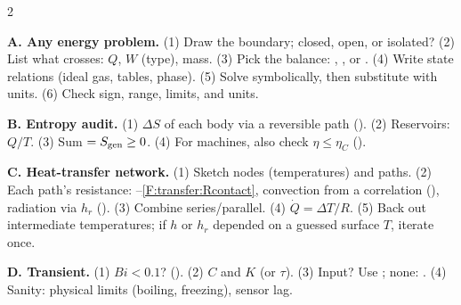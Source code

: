 \begin{multicols}{2}
\begin{keybox}\textbf{A. Any energy problem.} (1) Draw the boundary; closed, open, or isolated? (2) List what crosses: $Q$, $W$ (type), mass. (3) Pick the balance: , , or . (4) Write state relations (ideal gas, tables, phase). (5) Solve symbolically, then substitute with units. (6) Check sign, range, limits, and units.\end{keybox}

\begin{keybox}\textbf{B. Entropy audit.} (1) $\Delta S$ of each body via a reversible path (). (2) Reservoirs: $Q/T$. (3) Sum $=S_{\mathrm{gen}}\ge0$. (4) For machines, also check $\eta\le\eta_C$ ().\end{keybox}

\begin{keybox}\textbf{C. Heat-transfer network.} (1) Sketch nodes (temperatures) and paths. (2) Each path's resistance: --\eqref{F:transfer:Rcontact}, convection from a correlation (), radiation via $h_r$ (). (3) Combine series/parallel. (4) $\dot Q=\Delta T/R$. (5) Back out intermediate temperatures; if $h$ or $h_r$ depended on a guessed surface $T$, iterate once.\end{keybox}

\begin{keybox}\textbf{D. Transient.} (1) $Bi<0.1$? (). (2) $C$ and $K$ (or $\tau$). (3) Input? Use ; none: . (4) Sanity: physical limits (boiling, freezing), sensor lag.\end{keybox}
\end{multicols}
